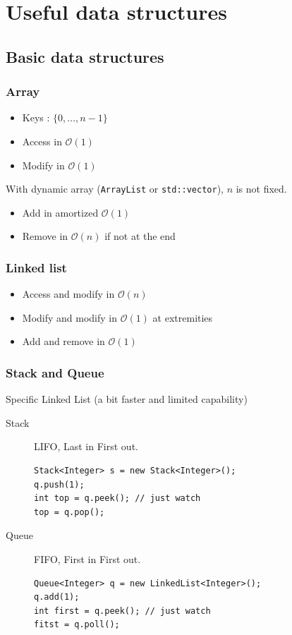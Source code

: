 \documentclass[10pt,svgnames,usenames,table]{beamer} %
\newcommand{\bigoh}{\mathcal{O}}
\begin{document}
\section{Useful data structures}
\subsection{Basic data structures}
\begin{frame}
  \frametitle{Array}
  \begin{itemize}
    \item Keys : $\{0, \ldots, n-1\}$
    \item Access in $\bigoh(1)$
    \item Modify in $\bigoh(1)$
  \end{itemize}
  With dynamic array (\lstinline|ArrayList| or \lstinline|std::vector|), $n$ is not fixed.
  \begin{itemize}
    \item Add in amortized $\bigoh(1)$
    \item Remove in $\bigoh(n)$ if not at the end
  \end{itemize}
\end{frame}

\begin{frame}
  \frametitle{Linked list}
  \begin{itemize}
    \item Access  and modify in $\bigoh(n)$
    \item Modify and modify in $\bigoh(1)$ at extremities
    \item Add and remove in $\bigoh(1)$
  \end{itemize}
\end{frame}

\begin{frame}[fragile]
  \frametitle{Stack and Queue}
  Specific Linked List (a bit faster and limited capability)
  \begin{description}
    \item[Stack] LIFO, Last in First out.
      \begin{lstlisting}
Stack<Integer> s = new Stack<Integer>();
q.push(1);
int top = q.peek(); // just watch
top = q.pop();
      \end{lstlisting}
    \item[Queue] FIFO, First in First out.
      \begin{lstlisting}
Queue<Integer> q = new LinkedList<Integer>();
q.add(1);
int first = q.peek(); // just watch
fitst = q.poll();
      \end{lstlisting}
  \end{description}
\end{frame}
\end{document}
